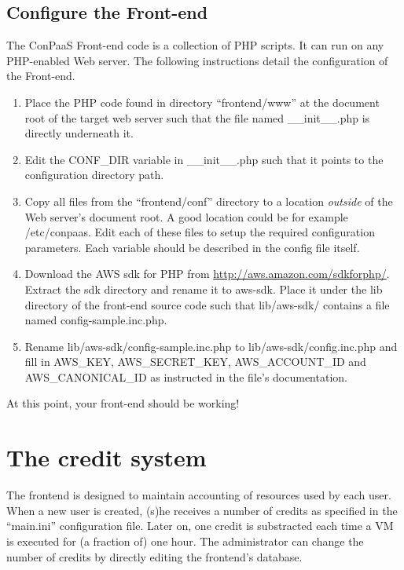 \documentclass[12pt]{article}
\begin{document}
\subsection{Configure the Front-end}

The ConPaaS Front-end code is a collection of PHP scripts. It can run
on any PHP-enabled Web server. The following instructions detail the
configuration of the Front-end.

\begin{enumerate}
\item Place the PHP code found in directory ``frontend/www'' at the
  document root of the target web server such that the file named
  \_\_init\_\_.php is directly underneath it.

\item Edit the CONF\_DIR variable in \_\_init\_\_.php such that it
  points to the configuration directory path.

\item Copy all files from the ``frontend/conf'' directory to a
  location \emph{outside} of the Web server's document root. A good
  location could be for example /etc/conpaas. Edit each of these files
  to setup the required configuration parameters. Each variable should
  be described in the config file itself.

\item Download the AWS sdk for PHP from
  \href{http://aws.amazon.com/sdkforphp/}{http://aws.amazon.com/sdkforphp/}.
  Extract the sdk directory and rename it to aws-sdk. Place it under
  the lib directory of the front-end source code such that
  lib/aws-sdk/ contains a file named config-sample.inc.php.

\item Rename lib/aws-sdk/config-sample.inc.php to
  lib/aws-sdk/config.inc.php and fill in AWS\_KEY, AWS\_SECRET\_KEY,
  AWS\_ACCOUNT\_ID and AWS\_CANONICAL\_ID as instructed in the file's
  documentation.
\end{enumerate}

At this point, your front-end should be working!

\section{The credit system}

The frontend is designed to maintain accounting of resources used by
each user. When a new user is created, (s)he receives a number of
credits as specified in the ``main.ini'' configuration file. Later on,
one credit is substracted each time a VM is executed for (a fraction
of) one hour. The administrator can change the number of credits by
directly editing the frontend's database. 
\end{document}
